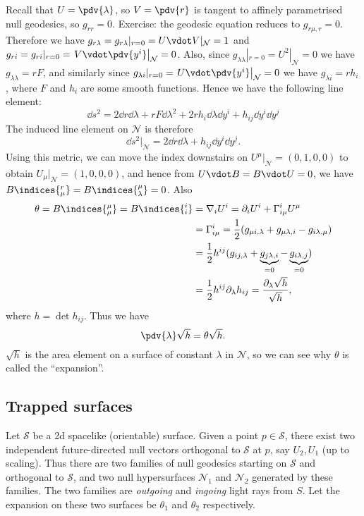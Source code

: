 \documentclass{jknotes}
\begin{document}
Recall that \(U=\pdv{\lambda}\), so \(V=\pdv{r}\) is tangent to affinely parametrised null geodesics, so \(g_{rr} = 0\). Exercise: the geodesic equation reduces to \(g_{r\mu,r} = 0\). Therefore we have \(g_{r\lambda} = g_{r\lambda}|_{r=0} = U\vdot V|_{\mathcal{N}} = 1\) and \(g_{ri} = g_{ri}|_{r=0} = \left.V\vdot \pdv{y^i}\right|_{\mathcal{N}} = 0\). Also, since \(g_{\lambda\lambda}|_{r=0} = U^2|_{\mathcal{N}} = 0\) we have \(g_{\lambda\lambda} = rF\), and similarly since \(g_{\lambda i} |_{r=0} = \left. U\vdot\pdv{y^i}\right|_{\mathcal{N}} = 0\) we have \(g_{\lambda i} = r h_i\), where \(F\) and \(h_i\) are some smooth functions. Hence we have the following line element:
\begin{equation}
    \dd{s}^2 = 2\dd{r}\dd{\lambda} + rF\dd{\lambda}^2 + 2rh_i\dd{\lambda}\dd{y^i} + h_{ij}\dd{y^i}\dd{y^j}
\end{equation}
The induced line element on \(\mathcal{N}\) is therefore
\begin{equation}
    \dd{s}^2|_{\mathcal{N}} = 2\dd{r}\dd{\lambda} + h_{ij}\dd{y^i}\dd{y^j}.
\end{equation}
Using this metric, we can move the index downstairs on \(U^\mu|_{\mathcal{N}} = (0,1,0,0)\) to obtain \(U_\mu|_{\mathcal{N}} = (1,0,0,0)\), and hence from \(U\vdot B = B\vdot U = 0\), we have \(B\indices{^r_\mu} = B\indices{^\mu_\lambda} = 0\). Also
\begin{align}
    \theta = B\indices{^\mu_\mu} = B\indices{^i_i} &= \nabla_i U^i = \partial_i U^i + \Gamma^i_{i\mu}U^\mu \\
       &= \Gamma^i_{i\mu} = \frac{1}{2}(g_{\mu i,\lambda} + g_{\mu\lambda,i} - g_{i\lambda,\mu}) \\
       &= \frac{1}{2} h^{ij} (g_{ij,\lambda} + \underbrace{g_{j\lambda,i}}_{=0} - \underbrace{g_{i\lambda,j}}_{=0}) \\
       &= \frac{1}{2}h^{ij}\partial_\lambda h_{ij} = \frac{\partial_\lambda\sqrt{h}}{\sqrt{h}},
\end{align}
where \(h = \det h_{ij}\). Thus we have
\begin{equation}
    \pdv{\lambda}\sqrt{h} = \theta\sqrt{h}.
\end{equation}
\(\sqrt{h}\) is the area element on a surface of constant \(\lambda\) in \(\mathcal{N}\), so we can see why \(\theta\) is called the ``expansion''.

\subsection{Trapped surfaces}
Let \(\mathcal{S}\) be a 2d spacelike (orientable) surface. Given a point \(p \in \mathcal{S}\), there exist two independent future-directed null vectors orthogonal to \(\mathcal{S}\) at \(p\), say \(U_2, U_1\) (up to scaling). Thus there are two families of null geodesics starting on \(\mathcal{S}\) and orthogonal to \(\mathcal{S}\), and two null hypersurfaces \(\mathcal{N}_1\) and \(\mathcal{N}_2\) generated by these families. The two families are \emph{outgoing} and \emph{ingoing} light rays from \(S\). Let the expansion on these two surfaces be \(\theta_1\) and \(\theta_2\) respectively.
\end{document}
